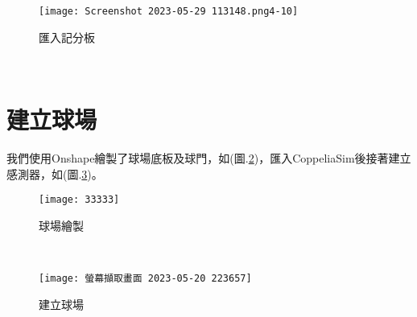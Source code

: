 \begin{figure}[hbt!]
\begin{center}
\texttt{[image: Screenshot 2023-05-29 113148.png4-10]}
\caption{\Large 匯入記分板}\label{匯入記分板}
\end{center}
\end{figure}\
\newpage
\section{建立球場}
我們使用Onshape繪製了球場底板及球門，如(圖.\ref{球場繪製})，匯入CoppeliaSim後接著建立感測器，如(圖.\ref{建立球場})。\

\begin{figure}[hbt!]
\begin{center}
\texttt{[image: 33333]}
\caption{\Large 球場繪製}\label{球場繪製}
\end{center}
\end{figure}\


\begin{figure}[hbt!]
\begin{center}
\texttt{[image: 螢幕擷取畫面 2023-05-20 223657]}
\caption{\Large 建立球場}\label{建立球場}
\end{center}
\end{figure}\

\newpage

